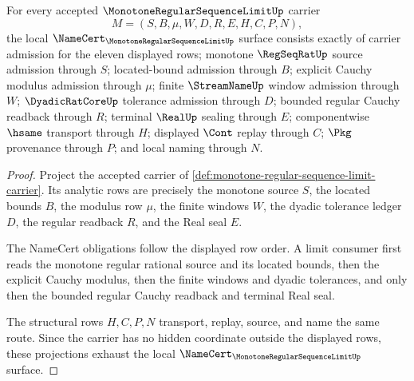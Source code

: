 \begin{theorem}
\label{thm:monotone-regular-sequence-limit-namecert-obligations}
For every accepted $\MonotoneRegularSequenceLimitUp$ carrier
$$
M=(S,B,\mu,W,D,R,E,H,C,P,N),
$$
the local $\NameCert_{\MonotoneRegularSequenceLimitUp}$ surface consists exactly of carrier admission for the eleven displayed rows; monotone $\RegSeqRatUp$ source admission through $S$; located-bound admission through $B$; explicit Cauchy modulus admission through $\mu$; finite $\StreamNameUp$ window admission through $W$; $\DyadicRatCoreUp$ tolerance admission through $D$; bounded regular Cauchy readback through $R$; terminal $\RealUp$ sealing through $E$; componentwise $\hsame$ transport through $H$; displayed $\Cont$ replay through $C$; $\Pkg$ provenance through $P$; and local naming through $N$.
\end{theorem}
\begin{proof}
Project the accepted carrier of \autoref{def:monotone-regular-sequence-limit-carrier}. Its analytic rows are precisely the monotone source $S$, the located bounds $B$, the modulus row $\mu$, the finite windows $W$, the dyadic tolerance ledger $D$, the regular readback $R$, and the Real seal $E$.

The NameCert obligations follow the displayed row order. A limit consumer first reads the monotone regular rational source and its located bounds, then the explicit Cauchy modulus, then the finite windows and dyadic tolerances, and only then the bounded regular Cauchy readback and terminal Real seal.

The structural rows $H,C,P,N$ transport, replay, source, and name the same route. Since the carrier has no hidden coordinate outside the displayed rows, these projections exhaust the local $\NameCert_{\MonotoneRegularSequenceLimitUp}$ surface.
\end{proof}

